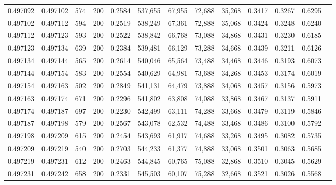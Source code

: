 \begin{tabular}{rrrrrrrrrrrrr}
0.497092 & 0.497102 &   574 & 200 &                                     0.2584 & 537,655 &  67,955 &  72,688 &  35,268 & 0.3417 & 0.3267 & 0.6295 \\
0.497102 & 0.497112 &   594 & 200 &                                     0.2519 & 538,249 &  67,361 &  72,888 &  35,068 & 0.3424 & 0.3248 & 0.6240 \\
0.497112 & 0.497123 &   593 & 200 &                                     0.2522 & 538,842 &  66,768 &  73,088 &  34,868 & 0.3431 & 0.3230 & 0.6185 \\
0.497123 & 0.497134 &   639 & 200 &                                     0.2384 & 539,481 &  66,129 &  73,288 &  34,668 & 0.3439 & 0.3211 & 0.6126 \\
0.497134 & 0.497144 &   565 & 200 &                                     0.2614 & 540,046 &  65,564 &  73,488 &  34,468 & 0.3446 & 0.3193 & 0.6073 \\
0.497144 & 0.497154 &   583 & 200 &                                     0.2554 & 540,629 &  64,981 &  73,688 &  34,268 & 0.3453 & 0.3174 & 0.6019 \\
0.497154 & 0.497163 &   502 & 200 &                                     0.2849 & 541,131 &  64,479 &  73,888 &  34,068 & 0.3457 & 0.3156 & 0.5973 \\
0.497163 & 0.497174 &   671 & 200 &                                     0.2296 & 541,802 &  63,808 &  74,088 &  33,868 & 0.3467 & 0.3137 & 0.5911 \\
0.497174 & 0.497187 &   697 & 200 &                                     0.2230 & 542,499 &  63,111 &  74,288 &  33,668 & 0.3479 & 0.3119 & 0.5846 \\
0.497187 & 0.497198 &   579 & 200 &                                     0.2567 & 543,078 &  62,532 &  74,488 &  33,468 & 0.3486 & 0.3100 & 0.5792 \\
0.497198 & 0.497209 &   615 & 200 &                                     0.2454 & 543,693 &  61,917 &  74,688 &  33,268 & 0.3495 & 0.3082 & 0.5735 \\
0.497209 & 0.497219 &   540 & 200 &                                     0.2703 & 544,233 &  61,377 &  74,888 &  33,068 & 0.3501 & 0.3063 & 0.5685 \\
0.497219 & 0.497231 &   612 & 200 &                                     0.2463 & 544,845 &  60,765 &  75,088 &  32,868 & 0.3510 & 0.3045 & 0.5629 \\
0.497231 & 0.497242 &   658 & 200 &                                     0.2331 & 545,503 &  60,107 &  75,288 &  32,668 & 0.3521 & 0.3026 & 0.5568 \\

\end{tabular}
